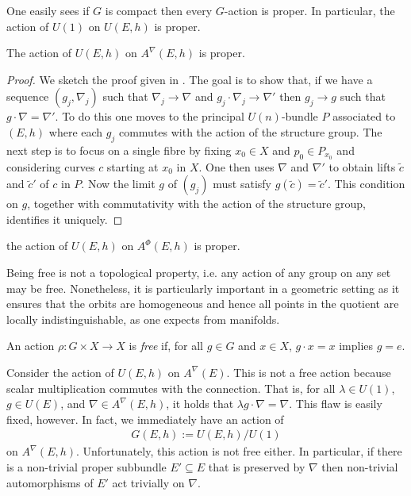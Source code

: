 \documentclass[12pt]{ociamthesis}  %
\begin{document}
\begin{example}
  One easily sees if $G$ is compact then every $G$-action is proper.
  In particular, the action of $U(1)$ on $U(E,h)$ is
  proper.
\end{example}

\begin{example}\label{ex:h_proper_action}
  The action of $U(E,h)$ on $A^\nabla(E,h)$ is proper.
  \begin{proof}
    We sketch the proof given in
    \cite[{Proposition 7.1.14}]{kobayashi1987}.
    The goal is to show that, if we have a sequence $(g_j,\nabla_j)$
    such that $\nabla_j\to\nabla$ and $g_j\cdot\nabla_j\to\nabla'$
    then $g_j\to g$ such that $g\cdot\nabla = \nabla'$. To do this
    one moves to the principal $U(n)$-bundle $P$ associated to $(E,h)$
    where each $g_j$ commutes with the action of the structure
    group. The next step is to focus on a single fibre by fixing $x_0\in X$ and
    $p_0\in P_{x_0}$ and considering curves $c$ starting at $x_0$ in $X$.
    One then uses $\nabla$ and $\nabla'$ to obtain lifts $\tilde c$ and
    $\tilde c'$ of $c$ in $P$. Now the limit $g$ of $(g_j)$ must satisfy
    $g(\tilde c) = \tilde c'$. This condition on $g$, together with
    commutativity with the action of the structure group, identifies it
    uniquely.
  \end{proof}
\end{example}

\begin{example}\label{ex:higgs_proper_action}
  the action of $U(E,h)$ on $A^\Phi (E,h)$ is proper.
  \missingexample
\end{example}

Being free is not a topological property, i.e. any action of any group on any
set may be free. Nonetheless, it is particularly important in a geometric
setting as it ensures that the orbits are homogeneous and hence all points in
the quotient are locally indistinguishable, as one expects from manifolds.

\begin{definition}
  An action $\rho : G\times X\to X$ is \emph{free} if, for all
  $g\in G$ and $x\in X$, $g\cdot x = x$ implies $g = e$.
\end{definition}

\begin{example}\label{ex:not_free}
  Consider the action of $U(E,h)$ on $A^\nabla(E)$. This is not a free action
  because scalar multiplication commutes with the connection. That is,
  for all $\lambda\in U(1)$, $g\in U(E)$, and $\nabla\in A^\nabla(E,h)$,
  it holds that $\lambda g\cdot \nabla = \nabla$. This flaw is easily fixed,
  however. In fact, we immediately have an action of
  \begin{align*}
    G(E,h) := U(E,h) / U(1)
  \end{align*}
  on $A^\nabla(E,h)$. Unfortunately, this action is not free either. In particular,
  if there is a non-trivial proper subbundle $E'\subseteq E$ that is preserved
  by $\nabla$ then non-trivial automorphisms of $E'$ act trivially on $\nabla$.
\end{example}
\end{document}
